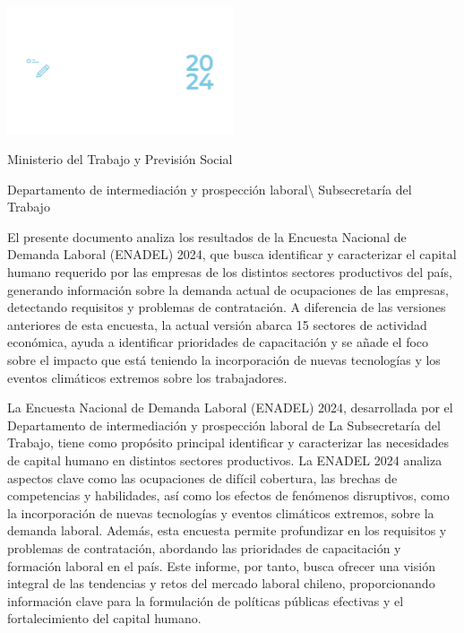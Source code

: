 \documentclass[
  11pt,
]{article}
\author{}
\date{}
\renewcommand*\contentsname{Tabla de contenidos}
\newcommand\contentsname{Tabla de contenidos}
\begin{document}




\pagecolor{customblue} 
\thispagestyle{empty} 
\color{white}

\centering

\includegraphics[width=0.5\textwidth]{../Logotipo ENADEL/Logotipo ENADEL-02.png}
\vspace{2cm}

\noindent Ministerio del Trabajo y Previsión Social

Departamento de intermediación y prospección laboral\textbackslash{}
Subsecretaría del Trabajo

\justifying

El presente documento analiza los resultados de la Encuesta Nacional de
Demanda Laboral (ENADEL) 2024, que busca identificar y caracterizar el
capital humano requerido por las empresas de los distintos sectores
productivos del país, generando información sobre la demanda actual de
ocupaciones de las empresas, detectando requisitos y problemas de
contratación. A diferencia de las versiones anteriores de esta encuesta,
la actual versión abarca 15 sectores de actividad económica, ayuda a
identificar prioridades de capacitación y se añade el foco sobre el
impacto que está teniendo la incorporación de nuevas tecnologías y los
eventos climáticos extremos sobre los trabajadores.

\newpage
\nopagecolor
\color{black}
\renewcommand{\contentsname}{Índice} 
\tableofcontents

\newpage

La Encuesta Nacional de Demanda Laboral (ENADEL) 2024, desarrollada por
el Departamento de intermediación y prospección laboral de La
Subsecretaría del Trabajo, tiene como propósito principal identificar y
caracterizar las necesidades de capital humano en distintos sectores
productivos. La ENADEL 2024 analiza aspectos clave como las ocupaciones
de difícil cobertura, las brechas de competencias y habilidades, así
como los efectos de fenómenos disruptivos, como la incorporación de
nuevas tecnologías y eventos climáticos extremos, sobre la demanda
laboral. Además, esta encuesta permite profundizar en los requisitos y
problemas de contratación, abordando las prioridades de capacitación y
formación laboral en el país. Este informe, por tanto, busca ofrecer una
visión integral de las tendencias y retos del mercado laboral chileno,
proporcionando información clave para la formulación de políticas
públicas efectivas y el fortalecimiento del capital humano.
\end{document}
